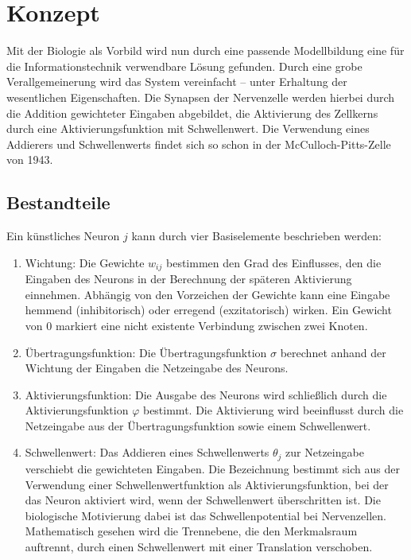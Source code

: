 
\chapter{Konzept}
\label{chapter-konzept}

Mit der Biologie als Vorbild wird nun durch eine passende Modellbildung eine für die Informationstechnik verwendbare Lösung gefunden. Durch eine grobe Verallgemeinerung wird das System vereinfacht – unter Erhaltung der wesentlichen Eigenschaften. Die Synapsen der Nervenzelle werden hierbei durch die Addition gewichteter Eingaben abgebildet, die Aktivierung des Zellkerns durch eine Aktivierungsfunktion mit Schwellenwert. Die Verwendung eines Addierers und Schwellenwerts findet sich so schon in der McCulloch-Pitts-Zelle von 1943.

\section{Bestandteile}

Ein künstliches Neuron $j$ kann durch vier Basiselemente beschrieben werden:
\begin{enumerate}
  \item Wichtung: Die Gewichte $w_{ij}$ bestimmen den Grad des Einflusses, den die Eingaben des Neurons in der Berechnung der späteren Aktivierung einnehmen. Abhängig von den Vorzeichen der Gewichte kann eine Eingabe hemmend (inhibitorisch) oder erregend (exzitatorisch) wirken. Ein Gewicht von 0 markiert eine nicht existente Verbindung zwischen zwei Knoten.
  \item Übertragungsfunktion: Die Übertragungsfunktion $\sigma$ berechnet anhand der Wichtung der Eingaben die Netzeingabe des Neurons.
  \item Aktivierungsfunktion: Die Ausgabe des Neurons wird schließlich durch die Aktivierungsfunktion $\varphi$ bestimmt. Die Aktivierung wird beeinflusst durch die Netzeingabe aus der Übertragungsfunktion sowie einem Schwellenwert. 
  \item Schwellenwert: Das Addieren eines Schwellenwerts $\theta_j$ zur Netzeingabe verschiebt die gewichteten Eingaben. Die Bezeichnung bestimmt sich aus der Verwendung einer Schwellenwertfunktion als Aktivierungsfunktion, bei der das Neuron aktiviert wird, wenn der Schwellenwert überschritten ist. Die biologische Motivierung dabei ist das Schwellenpotential bei Nervenzellen. Mathematisch gesehen wird die Trennebene, die den Merkmalsraum auftrennt, durch einen Schwellenwert mit einer Translation verschoben.
\end{enumerate}

